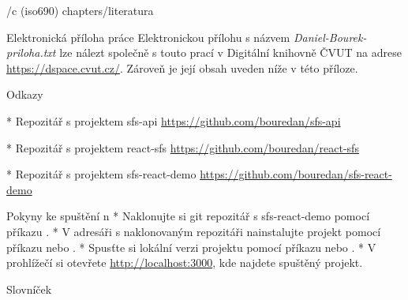 
\bibchap
\usebib/c (iso690) chapters/literatura

\app Elektronická příloha práce
Elektronickou přílohu s názvem {\em Daniel-Bourek-priloha.txt} lze nálezt společně s touto prací v 
Digitální knihovně ČVUT na adrese \url{https://dspace.cvut.cz/}. Zároveň je její obsah uveden níže v této příloze.

\sec Odkazy

\begitems

* Repozitář s projektem sfs-api\nl
\url{https://github.com/bouredan/sfs-api}\nl

* Repozitář s projektem react-sfs\nl
\url{https://github.com/bouredan/react-sfs}\nl

* Repozitář s projektem sfs-react-demo\nl
\url{https://github.com/bouredan/sfs-react-demo}

\enditems

\sec Pokyny ke spuštění
\begitems \style n
* Naklonujte si git repozitář s sfs-react-demo pomocí příkazu .
* V adresáři s naklonovaným repozitáři nainstalujte projekt pomocí příkazu  nebo .
* Spusťte si lokální verzi projektu pomocí příkazu  nebo .
* V prohlížečí si otevřete \url{http://localhost:3000}, kde najdete spuštěný projekt.
\enditems

\app Slovníček 
\makeglos

